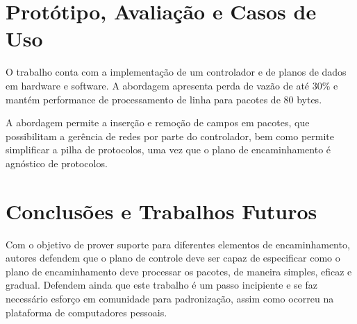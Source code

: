 \section*{Protótipo, Avaliação e Casos de Uso}

O trabalho conta com a implementação de um controlador e de planos de dados em hardware e software. A abordagem apresenta perda de vazão de até 30\% e mantém performance de processamento de linha para pacotes de 80 bytes.

A abordagem permite a inserção e remoção de campos em pacotes, que possibilitam a gerência de redes por parte do controlador, bem como permite simplificar a pilha de protocolos, uma vez que o plano de encaminhamento é agnóstico de protocolos.


\section*{Conclusões e Trabalhos Futuros}

Com o objetivo de prover suporte para diferentes elementos de encaminhamento, autores defendem que o plano de controle deve ser capaz de especificar como o plano de encaminhamento deve processar os pacotes, de maneira simples, eficaz e gradual. Defendem ainda que este trabalho é um passo incipiente e se faz necessário esforço em comunidade para padronização, assim como ocorreu na plataforma de computadores pessoais.
